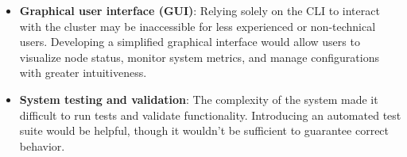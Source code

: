 \begin{itemize}
  \item \textbf{Graphical user interface (GUI)}: Relying solely on the CLI to interact 
    with the cluster may be inaccessible for less experienced or non-technical users. 
    Developing a simplified graphical interface would allow users to visualize node 
    status, monitor system metrics, and manage configurations with greater intuitiveness.

  \item \textbf{System testing and validation}: The complexity of the system made it
    difficult to run tests and validate functionality. Introducing an automated test 
    suite would be helpful, though it wouldn't be sufficient to guarantee correct behavior.
\end{itemize}
